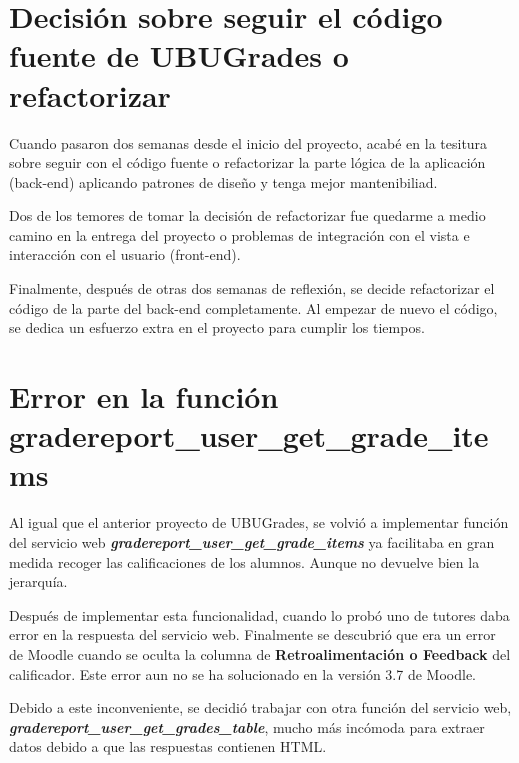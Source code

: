 \section{Decisión sobre seguir el código fuente de UBUGrades o refactorizar}

Cuando pasaron dos semanas desde el inicio del proyecto, acabé en la tesitura sobre seguir con el código fuente o refactorizar la parte lógica de la aplicación (back-end) aplicando patrones de diseño y tenga mejor mantenibiliad. 

Dos de los temores de tomar la decisión de refactorizar fue quedarme a medio camino en la entrega del proyecto o problemas de integración con el vista e interacción con el usuario (front-end).

Finalmente, después de otras dos semanas de reflexión, se decide refactorizar el código de la parte del back-end completamente. Al empezar de nuevo el código,  se dedica un esfuerzo extra en el proyecto para cumplir los tiempos.

\section{Error en la función gradereport\_user\_get\_grade\_items}

Al igual que el anterior proyecto de UBUGrades, se volvió a implementar función del servicio web \textbf{\textit{gradereport\_user\_get\_grade\_items}} ya facilitaba en gran medida recoger las calificaciones de los alumnos. Aunque no devuelve bien la jerarquía.


Después de implementar esta funcionalidad, cuando lo probó uno de tutores daba error en la respuesta del servicio web. Finalmente se descubrió que era un error de Moodle cuando se oculta la columna de \textbf{Retroalimentación o Feedback} del calificador\cite{zadok_[mdl-64298]_nodate}. Este error aun no se ha solucionado en la versión 3.7 de Moodle.


Debido a este inconveniente, se decidió trabajar con otra función del servicio web, \textbf{\textit{gradereport\_user\_get\_grades\_table}}, mucho más incómoda para extraer datos debido a que las respuestas contienen HTML. 


